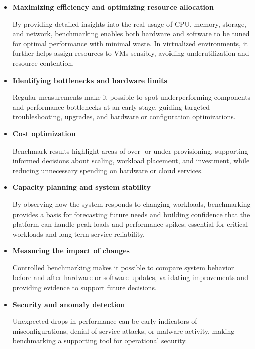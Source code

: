\begin{itemize}
    \item \textbf{Maximizing efficiency and optimizing resource allocation}
    
    By providing detailed insights into the real usage of CPU, memory, storage, and network, benchmarking enables both hardware and software to be tuned for optimal performance with minimal waste. In virtualized environments, it further helps assign resources to VMs sensibly, avoiding underutilization and resource contention.

    \item \textbf{Identifying bottlenecks and hardware limits}
    
    Regular measurements make it possible to spot underperforming components and performance bottlenecks at an early stage, guiding targeted troubleshooting, upgrades, and hardware or configuration optimizations.

    \item \textbf{Cost optimization}
    
    Benchmark results highlight areas of over- or under-provisioning, supporting informed decisions about scaling, workload placement, and investment, while reducing unnecessary spending on hardware or cloud services.

    \item \textbf{Capacity planning and system stability}
    
    By observing how the system responds to changing workloads, benchmarking provides a basis for forecasting future needs and building confidence that the platform can handle peak loads and performance spikes; essential for critical workloads and long-term service reliability.

    \item \textbf{Measuring the impact of changes}
    
    Controlled benchmarking makes it possible to compare system behavior before and after hardware or software updates, validating improvements and providing evidence to support future decisions.

    \item \textbf{Security and anomaly detection}
    
    Unexpected drops in performance can be early indicators of misconfigurations, denial-of-service attacks, or malware activity, making benchmarking a supporting tool for operational security.
\end{itemize}



